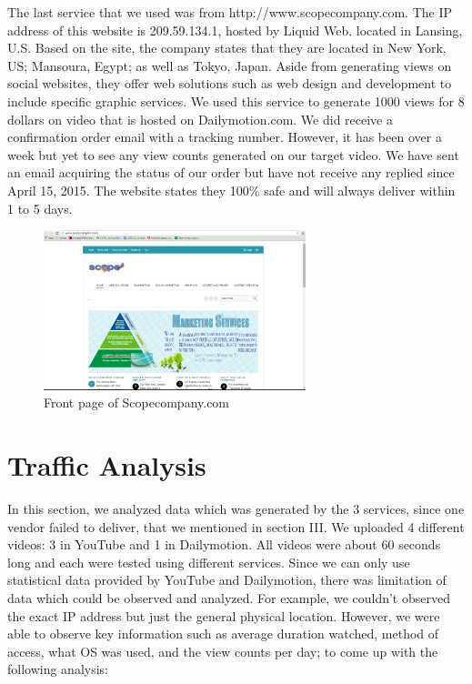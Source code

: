 \documentclass[conference]{IEEEtran}
\begin{document}
The last service that we used was from http://www.scopecompany.com. The IP address of this website is 209.59.134.1, hosted by Liquid Web. located in Lansing, U.S. Based on the site, the company states that they are located in New York, US; Mansoura, Egypt; as well as Tokyo, Japan. Aside from generating views on social websites, they offer web solutions such as web design and development to include specific graphic services.
We used this service to generate 1000 views for 8 dollars on video that is hosted on Dailymotion.com. We did receive a confirmation order email with a tracking number. However, it has been over a week but yet to see any view counts generated on our target video. We have sent an email acquiring the status of our order but have not receive any replied since April 15, 2015. The website states they 100\% safe and will always deliver within 1 to 5 days.

\begin{figure}
  \centering
  \includegraphics[width=3.0in]{fig4}
  \caption{Front page of Scopecompany.com}
\end{figure}

\section{Traffic Analysis}

In this section, we analyzed data which was generated by the 3 services, since one vendor failed to deliver, that we mentioned in section III. We uploaded 4 different videos: 3 in YouTube and 1 in Dailymotion. All videos were about 60 seconds long and each were tested using different services. Since we can only use statistical data provided by YouTube and Dailymotion, there was limitation of data which could be observed and analyzed. For example, we couldn’t observed the exact IP address but just the general physical location. However, we were able to observe key information such as average duration watched, method of access, what OS was used, and the view counts per day; to come up with the following analysis:
\end{document}
